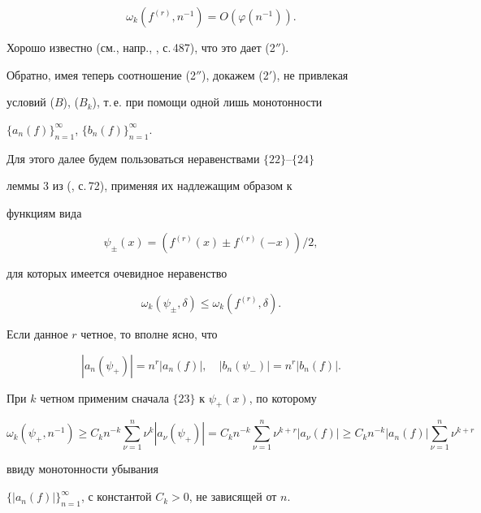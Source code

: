 $$


\omega_k(f^{(r)},n^{-1})=O(\varphi(n^{-1})).


$$


Хорошо известно (см., напр., \cite{B1}, с.\,487), что это дает (2$''$).





Обратно, имея теперь соотношение (2$''$), докажем (2$'$), не привлекая


условий ($B$), ($B_k$), т.\,е. при помощи одной лишь монотонности


$\{a_n(f)\}^\infty_{n=1}$, $\{b_n(f)\}^\infty_{n=1}$.


Для этого далее будем пользоваться неравенствами $\{22\}$--$\{24\}$


леммы 3 из (\cite{G3}, с.\,72), применяя их надлежащим образом к


функциям вида


$$


\psi_\pm(x)=(f^{(r)}(x)\pm f^{(r)}(-x))/2,


$$


для которых имеется очевидное неравенство


\begin{equation}


\omega_k(\psi_\pm,\delta)\le\omega_k(f^{(r)},\delta).


\end{equation}





Если данное $r$ четное, то вполне ясно, что


$$


|a_n(\psi_+)|=n^r|a_n(f)|,\quad


|b_n(\psi_-)|=n^r|b_n(f)|.


$$


При $k$ четном применим сначала $\{23\}$ к $\psi_+(x)$, по которому


$$


\omega_k(\psi_+,n^{-1})\ge C_k n^{-k}


\sum^n_{\nu=1}\nu^k|a_\nu(\psi_+)|=


C_k n^{-k}\sum^n_{\nu=1}\nu^{k+r}|a_\nu(f)|\ge


C_k n^{-k}|a_n(f)|\sum^n_{\nu=1}\nu^{k+r}


$$


ввиду монотонности убывания


$\{|a_n(f)|\}^\infty_{n=1}$, с константой $C_k>0$, не зависящей от $n$.


